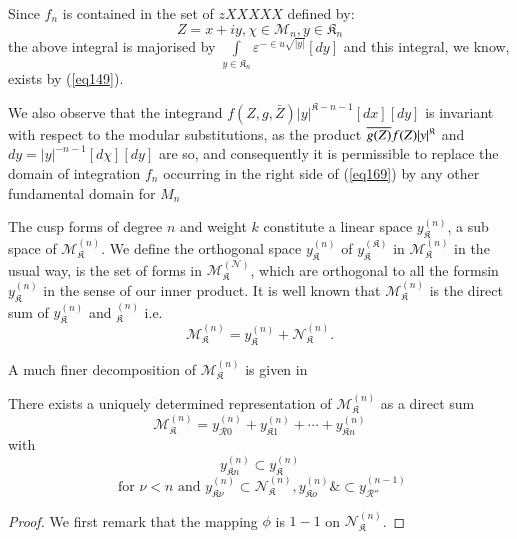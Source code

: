 Since $f_n$ is contained in the set of  $z XXXXX$ defined by: 
$$
Z=  x+i y , \chi \in \mathscr{M}_n , y \in\mathfrak{K}_n  
$$
the above integral is majorised by   $\int\limits_{y \in \mathfrak{K}_n}
\varepsilon ^{- \in u \sqrt{|y|}}[d y]$ and this integral, we know,
exists by (\ref{eq149}). 

We also observe that the integrand  $f(Z, g, \bar{Z})
|y|^{\mathfrak{K} - n - 1} [dx][dy]$  is invariant with
respect to the modular substitutions, as the product $\overline{g(Z)}\break
f(Z) |y|^\mathfrak{K}$ and $dy = |y|^{-n-1}[d \chi][ dy]$ are so, and
consequently it is permissible to replace the domain of integration
$f_n$ occurring in the right side of (\ref{eq169}) by any other fundamental
domain for $M_n$  

The cusp forms of degree $n$ and weight $k$   constitute a linear
space $y^{(n)}_{\mathfrak{K}}$, a sub space of
$\mathscr{M}^{(n)}_{\mathfrak{K}}$. We define the orthogonal space
$y^{(n)}_{\mathfrak{K}}$ of $y^{(\mathfrak{K})}_{\mathfrak{K}}$
in $\mathscr{M}^{(n)}_{\mathfrak{K}}$ in the usual way, is the set of
forms in  $\mathscr{M}^{(\mathscr{N})}_\mathfrak{K}$, which are
orthogonal to all the forms\pageoriginale  in $y^{(n)}_\mathfrak{K}$
in the sense of 
our inner product. It is well known that
$\mathscr{M}^{(n)}_\mathfrak{K}$ is the direct sum of
$y^{(n)}_\mathfrak{K}$ and $^{(n)}_\mathfrak{K}$  i.e. 
$$
\mathscr{M}^{(n)}_\mathfrak{K}= y^{(n)}_\mathfrak{K}+
\mathscr{N}^{(n)}_\mathfrak{K}. 
$$

A much finer decomposition  of $\mathscr{M}^{(n)}_\mathfrak{K}$ is
given in  

\setcounter{thm}{9}
\begin{thm}\label{chap10:thm10}%
There exists a uniquely determined representation of
$\mathscr{M}^{(n)}_\mathfrak{K}$ as a direct sum 
\begin{equation*}
\mathscr{M}^{(n)}_\mathfrak{K}= y^{(n)}_{\mathscr{R }0} +
y^{(n)}_{\mathfrak{K}1}+ \cdots +y^{(n)}_{\mathfrak{K}n}
\tag{170}\label{eq170} 
\end{equation*}
with
$$
y^{(n)}_{\mathfrak{K}n} \subset y^{(n)}_\mathfrak{K} 
$$
\begin{equation*} 
\text{ for } \nu < n \text{ and } y^{(n)}_{\mathfrak{K}\nu}
\subset \mathscr{N}^{(n)}_\mathfrak{K}, y^{(n)}_{\mathfrak{K}o} \&
\subset y^{(n-1)}_\mathscr{R ''} \tag{171}\label{eq171}  
\end{equation*}
\end{thm}

\begin{proof}
 We first remark that the mapping $\phi$ is $1-1$ on
 $\mathscr{N}^{(n)}_\mathfrak{K}$.  
\end{proof}

